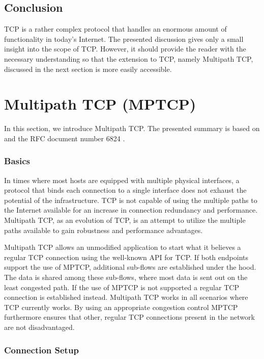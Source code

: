 \subsection*{Conclusion}

TCP is a rather complex protocol that handles an enormous amount of functionality in today's Internet. The presented discussion gives only a small insight into the scope of TCP. However, it should provide the reader with the necessary understanding so that the extension to TCP, namely Multipath TCP, discussed in the next section is more easily accessible.

\section{Multipath TCP (MPTCP)}
\label{sec:MPTCP}

In this section, we introduce Multipath TCP. The presented summary is based on \cite{Barre2011, Raiciu2012, Wischik2011} and the RFC document number 6824 \cite{rfc6824}.

\subsubsection{Basics}

In times where most hosts are equipped with multiple physical interfaces, a protocol that binds each connection to a single interface does not exhaust the potential of the infrastructure. TCP is not capable of using the multiple paths to the Internet available for an increase in connection redundancy and performance. Multipath TCP, as an evolution of TCP, is an attempt to utilize the multiple paths available to gain robustness and performance advantages.

Multipath TCP allows an unmodified application to start what it believes a regular TCP connection using the well-known API for TCP. If both endpoints support the use of MPTCP, additional sub-flows are established under the hood. The data is shared among these sub-flows, where most data is sent out on the least congested path. If the use of MPTCP is not supported a regular TCP connection is established instead. Multipath TCP works in all scenarios where TCP currently works. By using an appropriate congestion control MPTCP furthermore ensures that other, regular TCP connections present in the network are not disadvantaged. 

\subsubsection{Connection Setup}

